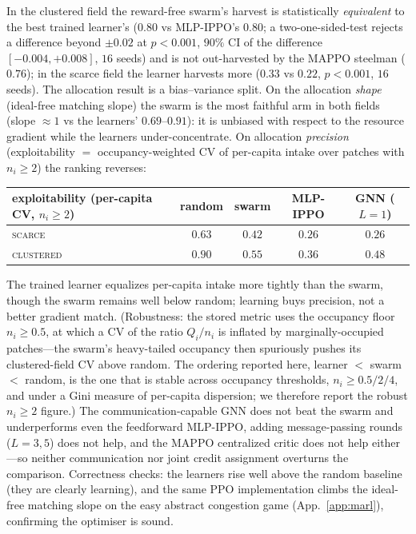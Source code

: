 \documentclass{article}
\begin{document}
In the clustered field the reward-free swarm's harvest is statistically \emph{equivalent} to the best trained
learner's ($0.80$ vs MLP-IPPO's $0.80$; a two-one-sided-test rejects a difference beyond $\pm0.02$ at $p<0.001$,
$90\%$ CI of the difference $[-0.004,+0.008]$, $16$ seeds) and is not out-harvested by the MAPPO steelman
($0.76$); in the scarce field the learner harvests more ($0.33$ vs $0.22$, $p<0.001$, $16$ seeds). The
allocation result is a bias--variance split. On the allocation \emph{shape} (ideal-free matching slope) the swarm
is the most faithful arm in both fields (slope ${\approx}1$ vs the learners' $0.69$--$0.91$): it is unbiased with
respect to the resource gradient while the learners under-concentrate. On allocation \emph{precision}
(exploitability $=$ occupancy-weighted CV of per-capita intake over patches with $n_i\ge2$) the ranking reverses:

\begin{center}{\small
\begin{tabular}{@{}lcccc@{}}
\hline
exploitability (per-capita CV, $n_i\ge2$) & random & swarm & MLP-IPPO & GNN ($L{=}1$) \\
\hline
\textsc{scarce}    & $0.63$ & $0.42$ & $0.26$ & $0.26$ \\
\textsc{clustered} & $0.90$ & $0.55$ & $0.36$ & $0.48$ \\
\hline
\end{tabular}}\end{center}

The trained learner equalizes per-capita intake more tightly than the swarm, though the swarm remains well below
random; learning buys precision, not a better gradient match. (Robustness: the stored metric uses the occupancy
floor $n_i\ge0.5$, at which a CV of the ratio $Q_i/n_i$ is inflated by marginally-occupied patches---the swarm's
heavy-tailed occupancy then spuriously pushes its clustered-field CV above random. The ordering reported here,
learner ${<}$ swarm ${<}$ random, is the one that is stable across occupancy thresholds, $n_i\ge0.5/2/4$, and
under a Gini measure of per-capita dispersion; we therefore report the robust $n_i\ge2$ figure.) The
communication-capable GNN does not beat the swarm and underperforms even the feedforward MLP-IPPO, adding
message-passing rounds ($L{=}3,5$) does not help, and the MAPPO centralized critic does not help either---so
neither communication nor joint credit assignment overturns the comparison. Correctness checks: the learners
rise well above the random baseline (they are clearly learning), and the same PPO implementation climbs the
ideal-free matching slope on the easy abstract congestion game (App.~\ref{app:marl}), confirming the optimiser is
sound.
\end{document}
